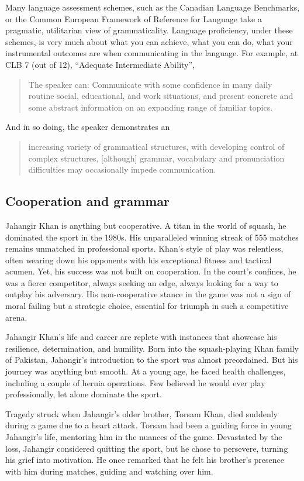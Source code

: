 Many language assessment schemes, such as the Canadian Language Benchmarks, or the Common European Framework of Reference for Language take a pragmatic, utilitarian view of grammaticality. Language proficiency, under these schemes, is very much about what you can achieve, what you can do, what your instrumental outcomes are when communicating in the language. For example, at CLB 7 (out of 12), ``Adequate Intermediate Ability'', \begin{quote}
    The speaker can: Communicate with some confidence in many daily routine social, educational, and work situations, and present concrete and some abstract information on an expanding range of familiar topics.
\end{quote} And in so doing, the speaker demonstrates an \begin{quote} 
    increasing variety of grammatical structures, with developing control of complex structures, [although] grammar, vocabulary and pronunciation difficulties may occasionally impede communication.
\end{quote}

\subsection{Cooperation and grammar}

Jahangir Khan is anything but cooperative. A titan in the world of squash, he dominated the sport in the 1980s. His unparalleled winning streak of 555 matches remains unmatched in professional sports. Khan's style of play was relentless, often wearing down his opponents with his exceptional fitness and tactical acumen. Yet, his success was not built on cooperation. In the court's confines, he was a fierce competitor, always seeking an edge, always looking for a way to outplay his adversary. His non-cooperative stance in the game was not a sign of moral failing but a strategic choice, essential for triumph in such a competitive arena.

Jahangir Khan's life and career are replete with instances that showcase his resilience, determination, and humility. Born into the squash-playing Khan family of Pakistan, Jahangir's introduction to the sport was almost preordained. But his journey was anything but smooth. At a young age, he faced health challenges, including a couple of hernia operations. Few believed he would ever play professionally, let alone dominate the sport.

Tragedy struck when Jahangir's older brother, Torsam Khan, died suddenly during a game due to a heart attack. Torsam had been a guiding force in young Jahangir's life, mentoring him in the nuances of the game. Devastated by the loss, Jahangir considered quitting the sport, but he chose to persevere, turning his grief into motivation. He once remarked that he felt his brother's presence with him during matches, guiding and watching over him.

